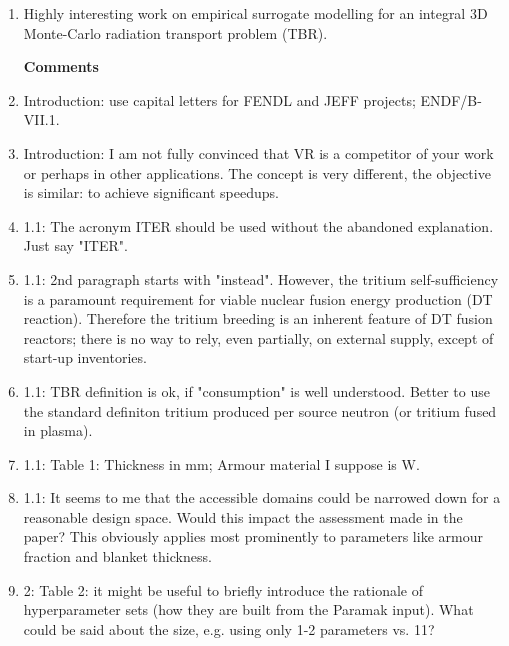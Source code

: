 \documentclass[12pt]{article}
\begin{document}
\begin{enumerate}
\item Highly interesting work on empirical surrogate modelling for an integral 3D Monte-Carlo radiation transport problem (TBR).

{\bf }

\bigskip
\noindent
{\bf Comments}

\item Introduction: use capital letters for FENDL and JEFF projects; ENDF/B-VII.1.

{\bf }

\item Introduction: I am not fully convinced that VR is a competitor of your work or perhaps in other applications. The concept is very different, the objective is similar: to achieve significant speedups.

{\bf }

\item 1.1: The acronym ITER should be used without the abandoned explanation. Just say "ITER".

{\bf }

\item 1.1: 2nd paragraph starts with "instead". However, the tritium self-sufficiency is a paramount requirement for viable nuclear fusion energy production (DT reaction). Therefore the tritium breeding is an inherent feature of DT fusion reactors; there is no way to rely, even partially, on external supply, except of start-up inventories.

{\bf }

\item 1.1: TBR definition is ok, if "consumption" is well understood. Better to use the standard definiton tritium produced per source neutron (or tritium fused in plasma).

{\bf }

\item 1.1: Table 1: Thickness in mm; Armour material I suppose is W.

{\bf }

\item 1.1: It seems to me that the accessible domains could be narrowed down for a reasonable design space. Would this impact the assessment made in the paper? This obviously applies most prominently to parameters like armour fraction and blanket thickness.

{\bf }

\item 2: Table 2: it might be useful to briefly introduce the rationale of hyperparameter sets (how they are built from the Paramak input). What could be said about the size, e.g. using only 1-2 parameters vs. 11?


\end{enumerate}
\end{document}
